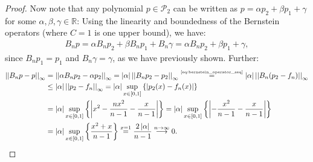 \begin{proof}
	Now note that any polynomial $p\in\mathcal P_2$ can be written as $p = \alpha p_2 + \beta p_1 + \gamma$ for some $\alpha, \beta, \gamma\in\mathbb R$: Using the linearity and boundedness of the Bernstein operators (where $C=1$ is one upper bound), we have:
	\begin{align}
		B_n p = \alpha B_n p_2 + \beta B_np_1 + B_n\gamma = \alpha B_n p_2 + \beta p_1 + \gamma,
	\end{align}
	since $B_n p_1 = p_1$ and $B_n\gamma = \gamma$, as we have previously shown. Further:
	\begin{align}
		\begin{split}
			\left\vert\left\vert B_n p - p \right\vert\right\vert_{\infty} &= \left\vert\left\vert \alpha B_np_2 - \alpha p_2 \right\vert\right\vert_{\infty} = \left\vert \alpha \right\vert\left\vert\left\vert B_n p_2 - p_2 \right\vert\right\vert_{\infty} \overset{\tiny\eqref{eq:bernstein_operator_seq}}{=} \left\vert \alpha \right\vert\left\vert\left\vert B_n(p_2 - f_n) \right\vert\right\vert_{\infty}
			\\ &\leq \left\vert \alpha \right\vert\left\vert\left\vert p_2 - f_n \right\vert\right\vert_{\infty} = \left\vert \alpha \right\vert\sup_{x\in[0, 1]}\left\{\left\vert p_2(x) - f_n(x) \right\vert\right\} 
			\\ &= \left\vert \alpha \right\vert\sup_{x\in[0, 1]}\left\{\left\vert x^2 - \frac{nx^2}{n-1}- \frac{x}{n-1} \right\vert\right\} = \left\vert \alpha \right\vert\sup_{x\in[0, 1]}\left\{\left\vert - \frac{x^2}{n-1}- \frac{x}{n-1} \right\vert\right\}
			\\ &= \left\vert \alpha \right\vert\sup_{x\in[0, 1]}\left\{ \frac{x^2 + x}{n-1} \right\} \overset{x=1}{=}\frac{2\left\vert \alpha \right\vert}{n-1} \overset{n\to\infty}{\longrightarrow} 0.
		\end{split}
	\end{align}	 
	
\end{proof}
